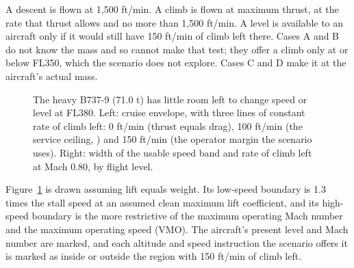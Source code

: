 A descent is flown at 1,500 ft/min. A climb is flown at maximum thrust, at the rate that thrust allows and no more than 1,500 ft/min. A level is available to an aircraft only if it would still have 150 ft/min of climb left there. Cases A and B do not know the mass and so cannot make that test; they offer a climb only at or below FL350, which the scenario does not explore. Cases C and D make it at the aircraft's actual mass.

\begin{figure}[htbp]
\centering
{}
\caption{The heavy B737-9 (71.0 t) has little room left to change speed or level at FL380. Left: cruise envelope, with three lines of constant rate of climb left: 0 ft/min (thrust equals drag), 100 ft/min (the service ceiling, \cite{faa2015ac61107b}) and 150 ft/min (the operator margin the scenario uses). Right: width of the usable speed band and rate of climb left at Mach 0.80, by flight level.}
\label{fig:envelope}
\end{figure}

Figure~\ref{fig:envelope} is drawn assuming lift equals weight. Its low-speed boundary is 1.3 times the stall speed at an assumed clean maximum lift coefficient, and its high-speed boundary is the more restrictive of the maximum operating Mach number and the maximum operating speed (VMO). The aircraft's present level and Mach number are marked, and each altitude and speed instruction the scenario offers it is marked as inside or outside the region with 150 ft/min of climb left.


